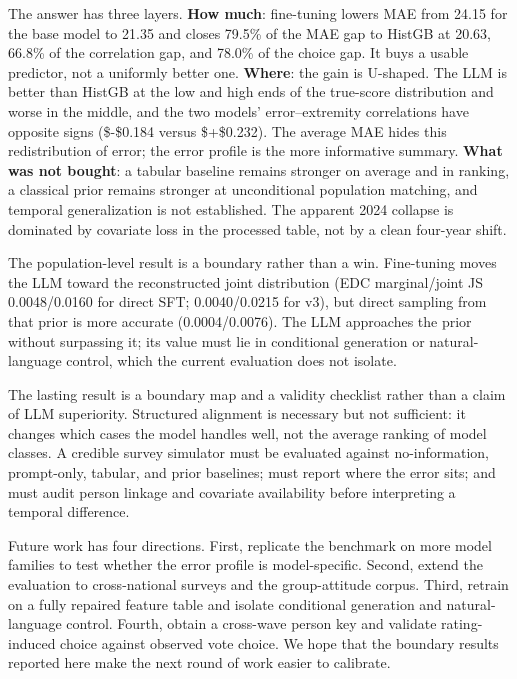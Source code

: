 The answer has three layers. \textbf{How much}: fine-tuning lowers MAE
from 24.15 for the base model to 21.35 and closes 79.5\% of the MAE gap
to HistGB at 20.63, 66.8\% of the correlation gap, and 78.0\% of the
choice gap. It buys a usable predictor, not a uniformly better one.
\textbf{Where}: the gain is U-shaped. The LLM is better than HistGB at
the low and high ends of the true-score distribution and worse in the
middle, and the two models' error--extremity correlations have opposite
signs (\$-\$0.184 versus \$+\$0.232). The average MAE hides this
redistribution of error; the error profile is the more informative
summary. \textbf{What was not bought}: a tabular baseline remains
stronger on average and in ranking, a classical prior remains stronger
at unconditional population matching, and temporal generalization is not
established. The apparent 2024 collapse is dominated by covariate loss
in the processed table, not by a clean four-year shift.

The population-level result is a boundary rather than a win. Fine-tuning
moves the LLM toward the reconstructed joint distribution (EDC
marginal/joint JS 0.0048/0.0160 for direct SFT; 0.0040/0.0215 for v3),
but direct sampling from that prior is more accurate (0.0004/0.0076).
The LLM approaches the prior without surpassing it; its value must lie
in conditional generation or natural-language control, which the current
evaluation does not isolate.

The lasting result is a boundary map and a validity checklist rather
than a claim of LLM superiority. Structured alignment is necessary but
not sufficient: it changes which cases the model handles well, not the
average ranking of model classes. A credible survey simulator must be
evaluated against no-information, prompt-only, tabular, and prior
baselines; must report where the error sits; and must audit person
linkage and covariate availability before interpreting a temporal
difference.

Future work has four directions. First, replicate the benchmark on more
model families to test whether the error profile is model-specific.
Second, extend the evaluation to cross-national surveys and the
group-attitude corpus. Third, retrain on a fully repaired feature table
and isolate conditional generation and natural-language control. Fourth,
obtain a cross-wave person key and validate rating-induced choice
against observed vote choice. We hope that the boundary results reported
here make the next round of work easier to calibrate.
